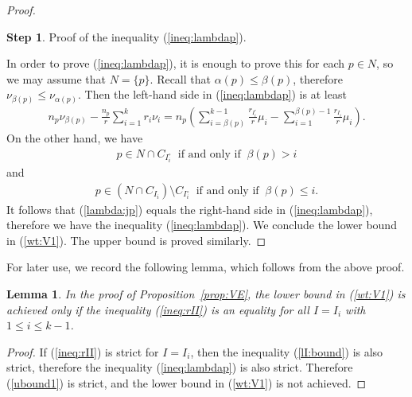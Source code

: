 \documentclass[11pt,oneside,a4paper,mathscr]{amsart}
\newtheorem{lemma}[thm]{Lemma}
\theoremstyle{definition}
\newtheorem{step}{Step}
\renewcommand{\leq}{\leqslant}
\begin{document}
\begin{proof}
\begin{step}
    Proof of the inequality (\ref{ineq:lambdap}).
\end{step}
In order to prove (\ref{ineq:lambdap}), it is enough to prove this for each $p\in N$, 
so we may assume that $N=\{p\}$.
Recall that $\alpha(p)\leq \beta(p)$, therefore 
$\nu_{\beta(p)} \leq \nu_{\alpha(p)}$. Then the left-hand side in (\ref{ineq:lambdap}) is at least
\begin{align}\label{lambda:jp}
   n_p \nu_{\beta(p)}-\frac{n_p}{r}
\sum_{i=1}^k r_i \nu_i=n_p\left(\sum_{i=\beta(p)}^{k-1}\frac{r_{I_i^{\circ}}}{r}\mu_i -\sum_{i=1}^{\beta(p)-1}\frac{r_{I_i}}{r}\mu_i\right).
\end{align}
On the other hand, we have 
\begin{align*}
    p \in N \cap C_{I_i^{\circ}} \ \mbox{ if and only if } \ \beta(p) > i
\end{align*}
and 
\begin{align*}
    p\in (N \cap C_{I_i})\setminus C_{I_i^{\circ}}  \ \mbox{ if and only if } \ \beta(p) \leq i.
\end{align*}
It follows that (\ref{lambda:jp}) equals the right-hand side in (\ref{ineq:lambdap}), therefore we have the inequality (\ref{ineq:lambdap}). We conclude the lower bound in (\ref{wt:V1}). The upper bound is proved similarly. 
\end{proof}

For later use, we record the following lemma, which follows from the above proof. 
\begin{lemma}\label{lem:lower}
In the proof of Proposition~\ref{prop:VE}, the lower bound in (\ref{wt:V1}) is achieved only if 
the inequality (\ref{ineq:rII}) is an equality for all $I=I_i$ with $1\leq i\leq k-1$.  
\end{lemma}
\begin{proof}
    If (\ref{ineq:rII}) is strict for $I=I_i$, then the inequality (\ref{lI:bound}) is also strict, 
    therefore the inequality (\ref{ineq:lambdap}) is also strict. Therefore (\ref{ubound1}) is strict, and the lower bound in (\ref{wt:V1}) is not achieved. 
\end{proof}
\end{document}

